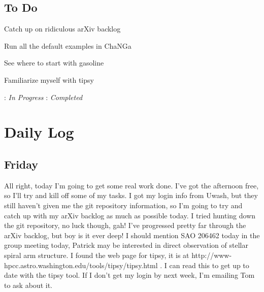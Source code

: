 \documentclass[11pt,letterpaper]{article}
\begin{document}
\subsection*{To Do}
\begin{bullets}
\item[\textleaf] Catch up on ridiculous arXiv backlog
\item[\textleaf] Run all the default examples in ChaNGa
\item See where to start with gasoline
\item Familiarize myself with tipsy
\end{bullets}

\textleaf : \textit{In Progress} \qquad \checkmark : \textit{Completed}

\section*{Daily Log}
\subsection*{Friday}
All right, today I'm going to get some real work done.  I've got the afternoon
free, so I'll try and kill off some of my tasks.  I got my login info from
Uwash, but they still haven't given me the git repository information, so I'm
going to try and catch up with my arXiv backlog as much as possible today.  
I tried hunting down the git repository, no luck though, gah!  I've progressed
pretty far through the arXiv backlog, but boy is it ever deep!  I should mention
SAO 206462 today in the group meeting today, Patrick may be interested in direct
observation of stellar spiral arm structure.  I found the web page for tipsy, it
is at http://www-hpcc.astro.washington.edu/tools/tipsy/tipsy.html .  I can read
this to get up to date with the tipsy tool.  If I don't get my login by next 
week, I'm emailing Tom to ask about it.
\end{document}
